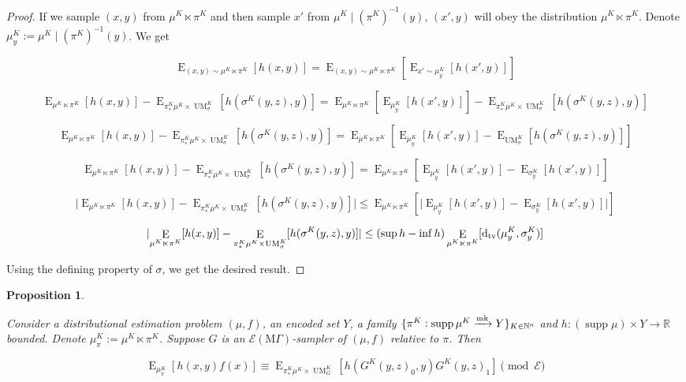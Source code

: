 \documentclass{article}
\numberwithin{equation}{section}
\theoremstyle{definition}
\theoremstyle{plain}
\newtheorem{proposition}{Proposition}[section]
\DeclareMathOperator{\Supp}{supp}
\DeclareMathOperator{\E}{E}
\DeclareMathOperator{\UM}{UM}
\newcommand{\Dtv}{\operatorname{d}_{\textnormal{tv}}}
\newcommand{\Nats}{\mathbb{N}}
\newcommand{\Reals}{\mathbb{R}}
\newcommand{\Abs}[1]{\lvert #1 \rvert}
\newcommand{\MGrow}{\mathrm{M}\Gamma}
\newcommand{\Fall}{\mathcal{E}}
\newcommand{\EMG}{\Fall(\MGrow)}
\newcommand{\Markov}{\xrightarrow{\textnormal{mk}}}
\begin{document}
\begin{proof}

If we sample $(x,y)$ from $\mu^{K} \ltimes \pi^K$ and then sample $x'$ from ${\mu^{K} \mid (\pi^K)^{-1}(y)}$, $(x',y)$ will obey the distribution $\mu^{K} \ltimes \pi^K$. Denote $\mu_y^K:=\mu^{K} \mid (\pi^K)^{-1}(y)$. We get

$$\E_{(x,y) \sim \mu^{K} \ltimes \pi^K}[h(x,y)] = \E_{(x,y) \sim \mu^{K} \ltimes \pi^K}[\E_{x' \sim \mu_y^K}[h(x',y)]]$$

$$\E_{\mu^{K} \ltimes \pi^K}[h(x,y)] - \E_{\pi_*^K\mu^{K} \times \UM_\sigma^K}[h(\sigma^K(y,z),y)] = \E_{\mu^{K} \ltimes \pi^K}[\E_{\mu_y^K}[h(x',y)]] - \E_{\pi_*^K\mu^{K} \times \UM_\sigma^K}[h(\sigma^K(y,z),y)]$$

$$\E_{\mu^{K} \ltimes \pi^K}[h(x,y)] - \E_{\pi_*^K\mu^{K} \times \UM_\sigma^K}[h(\sigma^K(y,z),y)] = \E_{\mu^{K} \ltimes \pi^K}[\E_{\mu_y^K}[h(x',y)]-\E_{\UM_\sigma^K}[h(\sigma^K(y,z),y)]]$$

$$\E_{\mu^{K} \ltimes \pi^K}[h(x,y)] - \E_{\pi_*^K\mu^{K} \times \UM_\sigma^K}[h(\sigma^K(y,z),y)] = \E_{\mu^{K} \ltimes \pi^K}[\E_{\mu_y^K}[h(x',y)]-\E_{\sigma_y^K}[h(x',y)]]$$

$$\Abs{\E_{\mu^{K} \ltimes \pi^K}[h(x,y)] - \E_{\pi_*^K\mu^{K} \times \UM_\sigma^K}[h(\sigma^K(y,z),y)]} \leq \E_{\mu^{K} \ltimes \pi^K}[\Abs{\E_{\mu_y^K}[h(x',y)]-\E_{\sigma_y^K}[h(x',y)]}]$$

$$\Abs{\E_{\mu^{K} \ltimes \pi^K}[h(x,y)] - \E_{\pi_*^K\mu^{K} \times \UM_\sigma^K}[h(\sigma^K(y,z),y)]} \leq (\sup h - \inf h) \E_{\mu^{K} \ltimes \pi^K}[\Dtv(\mu_y^K,\sigma_y^K)]$$

Using the defining property of $\sigma$, we get the desired result.
\end{proof}

\begin{proposition}
\label{prp:gen}

Consider a distributional estimation problem $(\mu,f)$, an encoded set $Y$, a family ${\{\pi^K: \Supp \mu^{K} \Markov Y\}_{K \in \Nats^n}}$ and ${h: (\Supp \mu) \times Y \rightarrow \Reals}$ bounded. Denote $\mu_\pi^K:=\mu^{K} \ltimes \pi^K$. Suppose $G$ is an $\EMG$-sampler of $(\mu,f)$ relative to $\pi$. Then

\begin{equation}
\E_{\mu_\pi^K}[h(x,y)f(x)] \equiv \E_{\pi_*^K\mu^{K} \times \UM_G^K}[h(G^K(y,z)_0,y)G^K(y,z)_1] \pmod \Fall
\end{equation}

\end{proposition}
\end{document}
